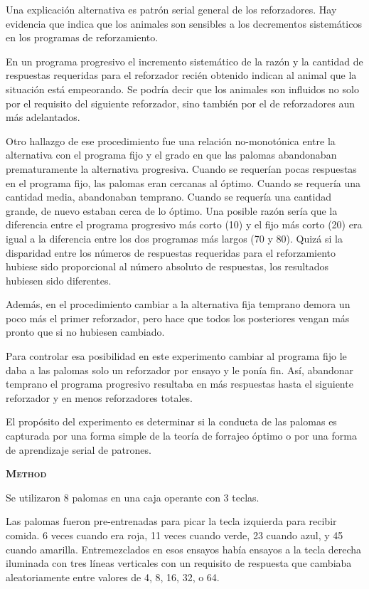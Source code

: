 \documentclass[a4paper,12pt]{article}
\begin{document}
Una explicación alternativa es patrón serial general de los reforzadores. Hay evidencia que indica que los animales son sensibles a los decrementos sistemáticos en los programas de reforzamiento.

En un programa progresivo el incremento sistemático de la razón y la cantidad de respuestas requeridas para el reforzador recién obtenido indican al animal que la situación está empeorando. Se podría decir que los animales son influidos no solo por el requisito del siguiente reforzador, sino también por el de reforzadores aun más adelantados.

Otro hallazgo de ese procedimiento fue una relación no-monotónica entre la alternativa con el programa fijo y el grado en que las palomas abandonaban prematuramente la alternativa progresiva. Cuando se requerían pocas respuestas en el programa fijo, las palomas eran cercanas al óptimo. Cuando se requería una cantidad media, abandonaban temprano. Cuando se requería una cantidad grande, de nuevo estaban cerca de lo óptimo. Una posible razón sería que la diferencia entre el programa progresivo más corto (10) y el fijo más corto (20) era igual a la diferencia entre los dos programas más largos (70 y 80). Quizá si la disparidad entre los números de respuestas requeridas para el reforzamiento hubiese sido proporcional al número absoluto de respuestas, los resultados hubiesen sido diferentes.

Además, en el procedimiento cambiar a la alternativa fija temprano demora un poco más el primer reforzador, pero hace que todos los posteriores vengan más pronto que si no hubiesen cambiado.

Para controlar esa posibilidad en este experimento cambiar al programa fijo le daba a las palomas solo un reforzador por ensayo y le ponía fin. Así, abandonar temprano el programa progresivo resultaba en más respuestas hasta el siguiente reforzador y en menos reforzadores totales.

El propósito del experimento es determinar si la conducta de las palomas es capturada por una forma simple de la teoría de forrajeo óptimo o por una forma de aprendizaje serial de patrones.

{\scshape\bfseries Method}

Se utilizaron 8 palomas en una caja operante con 3 teclas. 

Las palomas fueron pre-entrenadas para picar la tecla izquierda para recibir comida. 6 veces cuando era roja, 11 veces cuando verde, 23 cuando azul, y 45 cuando amarilla. Entremezclados en esos ensayos había ensayos a la tecla derecha iluminada con tres líneas verticales con un requisito de respuesta que cambiaba aleatoriamente entre valores de 4, 8, 16, 32, o 64.
\end{document}
